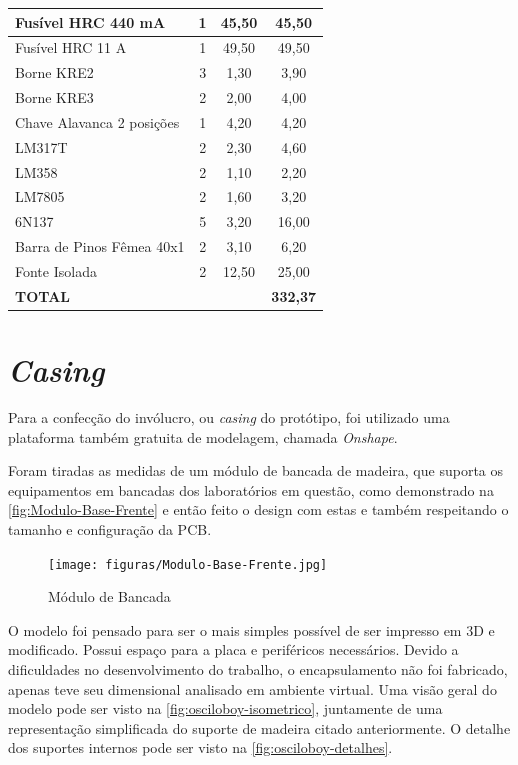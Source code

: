 \begin{table}[h!]
\begin{tabular}{|l|c|c|c|}
Fusível HRC 440 mA & 1 & 45,50 & 45,50 \\ \hline
Fusível HRC 11 A & 1 & 49,50 & 49,50 \\ \hline
Borne KRE2 & 3 & 1,30 & 3,90 \\ \hline
Borne KRE3 & 2 & 2,00 & 4,00 \\ \hline
Chave Alavanca 2 posições & 1 & 4,20 & 4,20 \\ \hline
LM317T & 2 & 2,30 & 4,60 \\ \hline
LM358 & 2 & 1,10 & 2,20 \\ \hline
LM7805 & 2 & 1,60 & 3,20 \\ \hline
6N137 & 5 & 3,20 & 16,00 \\ \hline
Barra de Pinos Fêmea 40x1 & 2 & 3,10 & 6,20 \\ \hline
Fonte Isolada & 2 & 12,50 & 25,00 \\ \hline
\textbf{TOTAL} &  &  & \textbf{332,37} \\ \hline
\end{tabular}
\end{table}


\section{\textit{Casing}}\label{Casing}

Para a confecção do invólucro, ou \textit{casing} do protótipo, foi utilizado uma plataforma também gratuita de modelagem, chamada \textit{Onshape}.

Foram tiradas as medidas de um módulo de bancada de madeira, que suporta os equipamentos em bancadas dos laboratórios em questão, como demonstrado na \autoref{fig:Modulo-Base-Frente} e então feito o design com estas e também respeitando o tamanho e configuração da \gls{PCB}.

\begin{figure}[htb!]
    \caption{Módulo de Bancada}
    \label{fig:Modulo-Base-Frente}
    \texttt{[image: figuras/Modulo-Base-Frente.jpg]}
    \fonte{}
\end{figure}

O modelo foi pensado para ser o mais simples possível de ser impresso em 3D e modificado. Possui espaço para a placa e periféricos necessários.
Devido a dificuldades no desenvolvimento do trabalho, o encapsulamento não foi fabricado, apenas teve seu dimensional analisado em ambiente virtual.
Uma visão geral do modelo pode ser visto na \autoref{fig:osciloboy-isometrico}, juntamente de uma representação simplificada do suporte de madeira citado anteriormente.
O detalhe dos suportes internos pode ser visto na \autoref{fig:osciloboy-detalhes}.

